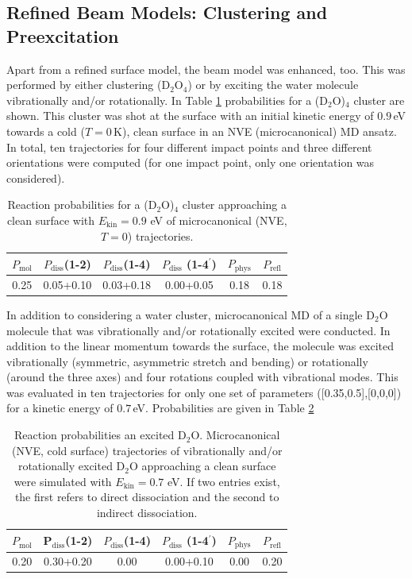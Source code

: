 \documentclass[11pt,DIV=13,BCOR=5mm,a4paper,headinclude]{scrbook}
\begin{document}
%
\subsection{Refined Beam Models: Clustering and Preexcitation}
Apart from a refined surface model, the beam model was enhanced, too.
This was performed by either clustering (D$_2$O$_4$) or by exciting the water molecule vibrationally and/or rotationally.
In Table \ref{tab:4D2O-cluster} probabilities for a (D$_2$O)$_4$ cluster are shown.
This cluster was shot at the surface with an initial kinetic energy of $0.9\,$eV towards a cold ($T=0\,$K), clean surface in an NVE (microcanonical) MD ansatz.
In total, ten trajectories for four different impact points and three different orientations were computed (for one impact point, only one orientation was considered).

\begin{table}[hbt]
 \centering
  \caption{Reaction probabilities for a (D$_2$O)$_4$ cluster approaching a clean surface with $E_\textrm{kin}=0.9$ eV of microcanonical (NVE, $T=0$) trajectories.}
 \begin{tabular}{cccccc}
\toprule
$P_\textrm{mol}$ & $P_\textrm{diss}$(1-2) &  $P_\textrm{diss}$(1-4) & $P_\textrm{diss}$ (1-4$^\prime$) & $P_\textrm{phys}$ & $P_\textrm{refl}$ \\\hline
0.25&0.05+0.10 &0.03+0.18 &0.00+0.05 &0.18 &0.18\\
\hline
\end{tabular}
 \label{tab:4D2O-cluster}
\end{table}

In addition to considering a water cluster, microcanonical MD of a single D$_2$O molecule that was vibrationally and/or rotationally excited were conducted.
In addition to the linear momentum towards the surface, the molecule was excited vibrationally (symmetric, asymmetric stretch and bending) or rotationally (around the three axes) and four rotations coupled with vibrational modes.
This was evaluated in ten trajectories for only one set of parameters ([0.35,0.5],[0,0,0]) for a kinetic energy of $0.7\,$eV.
Probabilities are given in Table \ref{tab:vib-rot_exc}
\begin{table}[!h]
 \centering
  \caption{Reaction probabilities an excited D$_2$O.
Microcanonical (NVE, cold surface) trajectories of vibrationally and/or rotationally excited D$_2$O approaching a clean surface were simulated with $E_\textrm{kin}=0.7$ eV.
If two entries exist, the first refers to direct dissociation and the second to indirect dissociation.}
 \begin{tabular}{cccccc}
\toprule
$P_\textrm{mol}$ & P$_\textrm{diss}$(1-2) &  $P_\textrm{diss}$(1-4) & $P_\textrm{diss}$ (1-4$^\prime$) & $P_\textrm{phys}$ & $P_\textrm{refl}$ \\\midrule
0.20&0.30+0.20 & 0.00 &0.00+0.10 &0.00 &0.20\\
\bottomrule
\end{tabular}
 \label{tab:vib-rot_exc}
\end{table}
\end{document}
